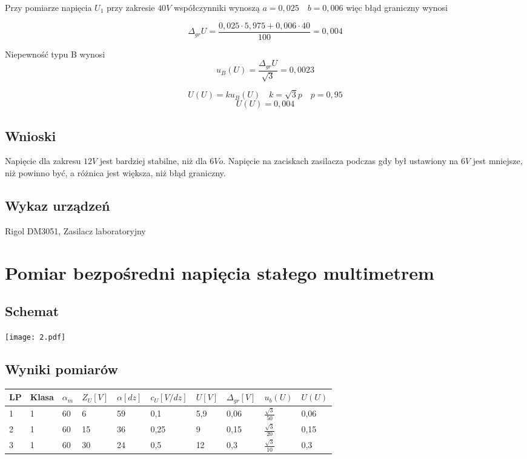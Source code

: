 \documentclass[11pt]{article}
\begin{document}
Przy pomiarze napięcia $U_1$ przy zakresie $40V$ współczynniki wynoszą $ a = 0,025 \quad b = 0,006 $ więc błąd graniczny wynosi 

$$ \Delta_{gr}U = \frac{0,025 \cdot 5,975 + 0,006 \cdot 40}{100} = 0,004$$

Niepewność typu B wynosi 
$$ u_B(U) = \frac{\Delta_{gr}U}{\sqrt{3}} = 0,0023$$

$$ U(U) = k u_B(U) \quad k = \sqrt{3}p \quad p = 0,95 $$
$$ U(U) = 0,004 $$

\subsection{Wnioski}
Napięcie dla zakresu $12V$ jest bardziej stabilne, niż dla $6Vo$. Napięcie na zaciskach zasilacza podczas gdy był ustawiony na $6V$ jest mniejsze, niż powinno być, a różnica jest większa, niż błąd graniczny.

\subsection{Wykaz urządzeń}
Rigol DM3051, Zasilacz laboratoryjny

\newpage
\section{Pomiar bezpośredni napięcia stałego multimetrem}

\subsection{Schemat}
\begin{center}
\texttt{[image: 2.pdf]}
\end{center}
\subsection{Wyniki pomiarów}
\begin{center}
\begin{tabular}{|l|l|l|l|l|l|l|l|l|l|}
\hline
	LP & Klasa & $\alpha_m$ & $Z_{U}[V]$ & $\alpha[dz]$ & $c_U[V/dz]$ & $U[V]$ & $\Delta_{gr}[V]$ & $u_b(U)$ & $U(U)$\\
\hline
	1 & 1 & 60 & 6 & 59 & 0,1 & 5,9 & 0,06 & $\frac{\sqrt{3}}{50}$ & 0,06\\
\hline
	2 & 1 & 60 & 15 & 36 & 0,25 & 9 & 0,15 & $\frac{\sqrt{3}}{20}$ & 0,15\\
\hline
	3 & 1 & 60 & 30 & 24 & 0,5 & 12 & 0,3 & $\frac{\sqrt{3}}{10}$ & 0,3 \\
\hline
\end{tabular}
\end{center}
\end{document}
